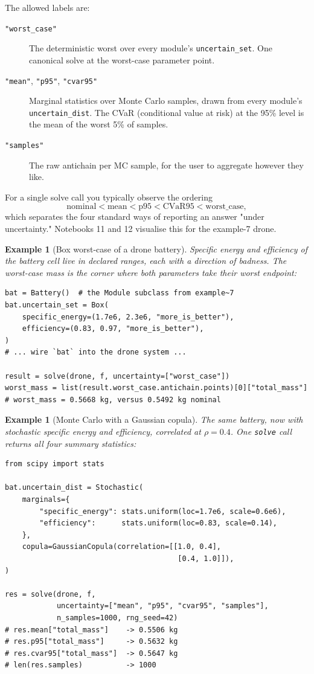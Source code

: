 \documentclass[11pt,a4paper]{article}
\newtheorem{example}[definition]{Example}
\begin{document}
The allowed labels are:
\begin{description}
\item[\texttt{"worst\_case"}] The deterministic worst over every
module's \texttt{uncertain\_set}. One canonical solve at the
worst-case parameter point.
\item[\texttt{"mean"}, \texttt{"p95"}, \texttt{"cvar95"}] Marginal
statistics over Monte Carlo samples, drawn from every module's
\texttt{uncertain\_dist}. The CVaR (conditional value at risk) at the
95\% level is the mean of the worst 5\% of samples.
\item[\texttt{"samples"}] The raw antichain per MC sample, for the
user to aggregate however they like.
\end{description}

For a single solve call you typically observe the ordering
\[
\text{nominal} < \text{mean} < \text{p95} < \text{CVaR95} < \text{worst\_case},
\]
which separates the four standard ways of reporting an answer "under
uncertainty." Notebooks 11 and 12 visualise this for the
example-7 drone.

\begin{example}[Box worst-case of a drone battery]
Specific energy and efficiency of the battery cell live in declared
ranges, each with a direction of badness. The worst-case mass is
the corner where both parameters take their worst endpoint:
\begin{lstlisting}
bat = Battery()  # the Module subclass from example~7
bat.uncertain_set = Box(
    specific_energy=(1.7e6, 2.3e6, "more_is_better"),
    efficiency=(0.83, 0.97, "more_is_better"),
)
# ... wire `bat` into the drone system ...

result = solve(drone, f, uncertainty=["worst_case"])
worst_mass = list(result.worst_case.antichain.points)[0]["total_mass"]
# worst_mass = 0.5668 kg, versus 0.5492 kg nominal
\end{lstlisting}
\end{example}

\begin{example}[Monte Carlo with a Gaussian copula]
The same battery, now with stochastic specific energy and
efficiency, correlated at $\rho = 0.4$. One \texttt{solve} call
returns all four summary statistics:
\begin{lstlisting}
from scipy import stats

bat.uncertain_dist = Stochastic(
    marginals={
        "specific_energy": stats.uniform(loc=1.7e6, scale=0.6e6),
        "efficiency":      stats.uniform(loc=0.83, scale=0.14),
    },
    copula=GaussianCopula(correlation=[[1.0, 0.4],
                                        [0.4, 1.0]]),
)

res = solve(drone, f,
            uncertainty=["mean", "p95", "cvar95", "samples"],
            n_samples=1000, rng_seed=42)
# res.mean["total_mass"]    -> 0.5506 kg
# res.p95["total_mass"]     -> 0.5632 kg
# res.cvar95["total_mass"]  -> 0.5647 kg
# len(res.samples)          -> 1000
\end{lstlisting}
\end{example}
\end{document}
